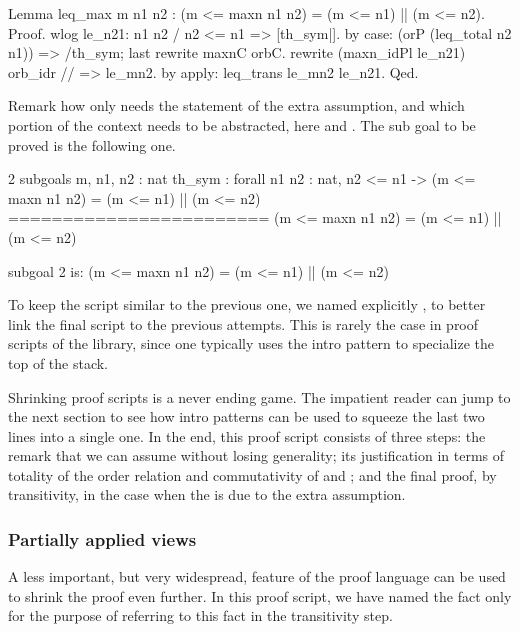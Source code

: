 \begin{coq}{}{}
Lemma leq_max m n1 n2 : (m <= maxn n1 n2) = (m <= n1) || (m <= n2).
Proof.
wlog le_n21: n1 n2 / n2 <= n1  => [th_sym|].
  by case: (orP (leq_total n2 n1)) => /th_sym; last rewrite maxnC orbC.
rewrite (maxn_idPl le_n21) orb_idr // => le_mn2.
by apply: leq_trans le_mn2 le_n21.
Qed.
\end{coq}

Remark how  only needs the statement of the extra assumption,
and which portion of the context needs to be abstracted, here  and
.  The sub goal to be proved is the following one.

\begin{coqout}{}{}
2 subgoals
m, n1, n2 : nat
th_sym : forall n1 n2 : nat, n2 <= n1 ->
           (m <= maxn n1 n2) = (m <= n1) || (m <= n2)
========================
(m <= maxn n1 n2) = (m <= n1) || (m <= n2)


subgoal 2 is:
(m <= maxn n1 n2) = (m <= n1) || (m <= n2)
\end{coqout}

To keep the script similar to the previous one, we named explicitly
, to better link the final script to the previous attempts.
This is rarely the case in proof scripts of the library, since one typically
uses the  intro pattern to specialize the top of the stack.

Shrinking proof scripts is a never ending game.  The impatient reader can
jump to the next section to see
how intro patterns can be used to squeeze the last two lines into a
single one.  In the end, this proof script consists of three steps:
the remark that we can
assume  without losing generality; its justification in
terms of totality of the order relation and commutativity of 
and \C{||}; and the final proof, by transitivity, in the case when
the  is  due to the extra assumption.

\subsubsection{Partially applied views}

A less important, but very widespread, feature of the \mcbSSR{}
proof language can be used to shrink the proof even further.
In this proof script, we have named the fact  only for the
purpose of referring to this fact in the transitivity step.


